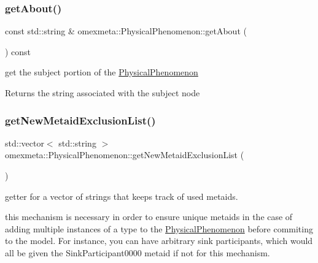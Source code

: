 \subsubsection{\texorpdfstring{get\+About()}{getAbout()}}
{\footnotesize\ttfamily const std\+::string \& omexmeta\+::\+Physical\+Phenomenon\+::get\+About (\begin{DoxyParamCaption}{ }\end{DoxyParamCaption}) const}



get the subject portion of the \hyperlink{classomexmeta_1_1PhysicalPhenomenon}{Physical\+Phenomenon} 

\begin{DoxyReturn}{Returns}
the string associated with the subject node 
\end{DoxyReturn}
\mbox{\label{classomexmeta_1_1PhysicalPhenomenon_a54d90cf6db78e98bd091f478dc5bd74a}} 
\subsubsection{\texorpdfstring{get\+New\+Metaid\+Exclusion\+List()}{getNewMetaidExclusionList()}}
{\footnotesize\ttfamily std\+::vector$<$ std\+::string $>$ omexmeta\+::\+Physical\+Phenomenon\+::get\+New\+Metaid\+Exclusion\+List (\begin{DoxyParamCaption}{ }\end{DoxyParamCaption})\hspace{0.3cm}{\ttfamily [protected]}}



getter for a vector of strings that keeps track of used metaids. 

this mechanism is necessary in order to ensure unique metaids in the case of adding multiple instances of a type to the \hyperlink{classomexmeta_1_1PhysicalPhenomenon}{Physical\+Phenomenon} before commiting to the model. For instance, you can have arbitrary sink participants, which would all be given the Sink\+Participant0000 metaid if not for this mechanism. \mbox{\label{classomexmeta_1_1PhysicalPhenomenon_ac741cab1f6df58b0de484fc1771ef839}} 
